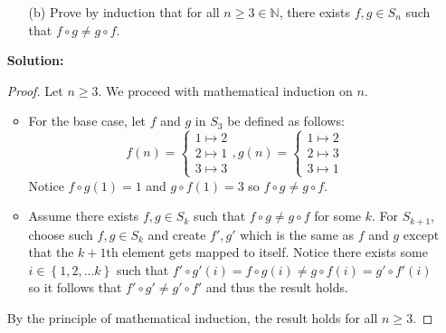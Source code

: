 \documentclass[letterpaper,12pt]{article}
\newcommand{\set}[1]{\left\{ #1 \right\}}
\theoremstyle{definition}
\begin{document}
\begin{enumerate}
   \item[] \begin{enumerate}
       \item[(b)]  Prove by induction that for all $n \geq 3 \in \mathbb{N}$, there exists $f,g \in S_n$ such that $f \circ g \neq g \circ f$.
   \end{enumerate}
    \begin{mdframed}
            \textbf{Solution:}
            \begin{proof}
            Let $n \geq 3$. We proceed with mathematical induction on $n$. \begin{itemize}
                \item For the base case, let $f$ and $g$ in $S_3$ be defined as follows: $$f(n) = \left \{\begin{matrix}
                    1 \mapsto 2 \\ 2 \mapsto 1 \\ 3 \mapsto 3
                \end{matrix} \right. , g(n) = \left \{\begin{matrix}
                    1 \mapsto 2 \\ 2 \mapsto 3 \\ 3 \mapsto 1
                \end{matrix} \right.$$ Notice $f\circ g(1) = 1$ and $g \circ f(1) = 3$ so $f \circ g \neq g \circ f$.
                \item Assume there exists $f,g \in S_k$ such that $f \circ g \neq g \circ f$ for some $k$. For $S_{k+1}$, choose such $f,g \in S_k$ and create $f',g'$ which is the same as $f$ and $g$ except that the $k+1$th element gets mapped to itself. Notice there exists some $i \in \set{1,2,\ldots k}$ such that $f'\circ g'(i) = f \circ g(i) \neq g \circ f (i)= g' \circ f' (i)$ so it follows that $f' \circ g' \neq g'\circ f'$ and thus the result holds.
            \end{itemize}
              By the principle of mathematical induction, the result holds for all $n \geq 3$.
            \end{proof}
        \end{mdframed}
\end{enumerate}
\end{document}
